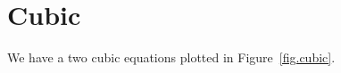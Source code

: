 \section{Cubic}
\label{sec.cubic}
\lipsum[7-8] %

We have a two cubic equations plotted in Figure~\ref{fig.cubic}.


